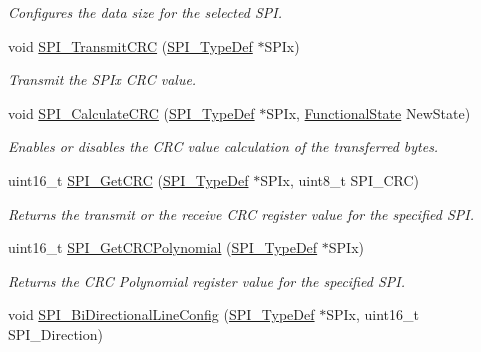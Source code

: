 \begin{DoxyCompactItemize}
\begin{DoxyCompactList}\small\item\em Configures the data size for the selected S\+PI. \end{DoxyCompactList}\item 
void \hyperlink{group___s_p_i___exported___functions_gace8b1058e09bab150b0dbe5978810273}{S\+P\+I\+\_\+\+Transmit\+C\+RC} (\hyperlink{struct_s_p_i___type_def}{S\+P\+I\+\_\+\+Type\+Def} $\ast$S\+P\+Ix)
\begin{DoxyCompactList}\small\item\em Transmit the S\+P\+Ix C\+RC value. \end{DoxyCompactList}\item 
void \hyperlink{group___s_p_i___exported___functions_ga64f7276d119e6cb58afc100f8832adb0}{S\+P\+I\+\_\+\+Calculate\+C\+RC} (\hyperlink{struct_s_p_i___type_def}{S\+P\+I\+\_\+\+Type\+Def} $\ast$S\+P\+Ix, \hyperlink{group___exported__types_gac9a7e9a35d2513ec15c3b537aaa4fba1}{Functional\+State} New\+State)
\begin{DoxyCompactList}\small\item\em Enables or disables the C\+RC value calculation of the transferred bytes. \end{DoxyCompactList}\item 
uint16\+\_\+t \hyperlink{group___s_p_i___exported___functions_ga4c81c193516e82cf0a2fdc149ef20cc6}{S\+P\+I\+\_\+\+Get\+C\+RC} (\hyperlink{struct_s_p_i___type_def}{S\+P\+I\+\_\+\+Type\+Def} $\ast$S\+P\+Ix, uint8\+\_\+t S\+P\+I\+\_\+\+C\+RC)
\begin{DoxyCompactList}\small\item\em Returns the transmit or the receive C\+RC register value for the specified S\+PI. \end{DoxyCompactList}\item 
uint16\+\_\+t \hyperlink{group___s_p_i___exported___functions_ga80fb9374cfce670f29128bb78568353f}{S\+P\+I\+\_\+\+Get\+C\+R\+C\+Polynomial} (\hyperlink{struct_s_p_i___type_def}{S\+P\+I\+\_\+\+Type\+Def} $\ast$S\+P\+Ix)
\begin{DoxyCompactList}\small\item\em Returns the C\+RC Polynomial register value for the specified S\+PI. \end{DoxyCompactList}\item 
void \hyperlink{group___s_p_i___exported___functions_ga166171c421fc51da7714723524d41b45}{S\+P\+I\+\_\+\+Bi\+Directional\+Line\+Config} (\hyperlink{struct_s_p_i___type_def}{S\+P\+I\+\_\+\+Type\+Def} $\ast$S\+P\+Ix, uint16\+\_\+t S\+P\+I\+\_\+\+Direction)

\end{DoxyCompactItemize}

